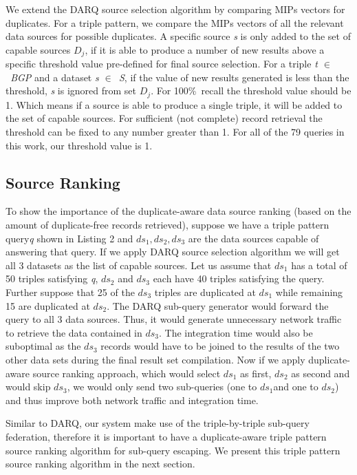 \documentclass{sig-alternate}  %
\begin{document}
We extend the DARQ source selection algorithm by comparing MIPs vectors
 for duplicates. For a triple pattern, we compare the MIPs
vectors of all the relevant data sources for possible duplicates.
A specific source \emph{s} is only added to the set of capable sources $D_j$,
if it is able to produce a number of new results above a specific threshold value
pre-defined for final source selection. For a triple \emph{t $\in$\ BGP} and a dataset \emph{s $\in$\ S}, if the value of new results generated
is less than the threshold, \emph{s} is ignored from set $D_j$. For 100\%\ recall the threshold value should be 1. Which means if a source is able to produce a single triple, it will be added to the set of capable sources. For sufficient (not complete) record retrieval the threshold can be fixed to any number greater than 1. For all of the 79 queries in this work, our threshold value is 1. 

\subsection{Source Ranking} 
To show the importance of the duplicate-aware data source ranking (based on the amount of duplicate-free records retrieved), suppose we have a triple pattern query\emph{q} shown in Listing 2  and \emph{$ ds_1, ds_2, ds_3 $} are the data sources capable of answering that query. If we apply DARQ source selection algorithm we will get all 3 datasets as the list of capable sources. Let us assume that $ds_1$ has a total of 50 triples satisfying \emph{q}, $ds_2$ and $ds_3$ each have 40 triples satisfying the query. Further suppose that 25 of the $ds_3$ triples are duplicated at $ds_1$ while remaining 15 are duplicated at $ds_2$. The DARQ sub-query generator would forward the query to all 3 data sources. Thus, it would generate unnecessary network traffic to retrieve the data contained in $ds_3$. 
The integration time would also be suboptimal as the $ds_3$ records would have to be joined to the results of the two other data sets during the final result set compilation. Now if we apply duplicate-aware source ranking approach, which would select $ds_1$ as first, $ds_2$ as second and would skip $ds_3$, we would only send two sub-queries (one to $ds_1$and one to $ds_2$) and thus improve both network traffic and integration time.

Similar to DARQ, our system make use of the triple-by-triple sub-query federation, therefore it is important to have a duplicate-aware triple pattern source ranking algorithm for sub-query escaping. We present this triple pattern source ranking algorithm in the next section. 
\end{document}
